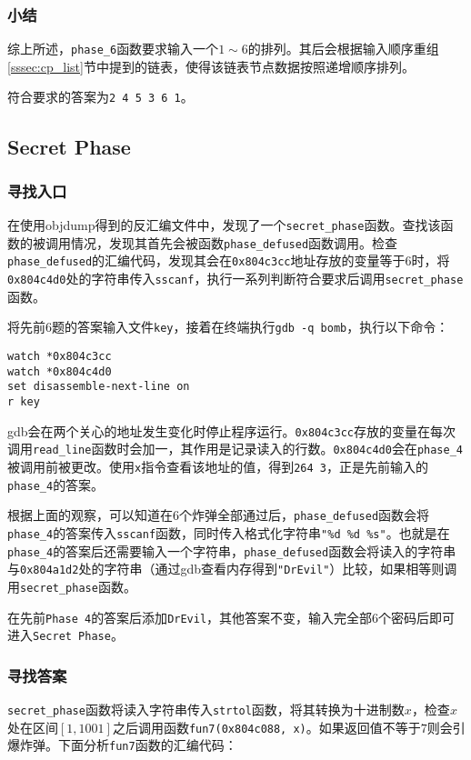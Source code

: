 \documentclass[a4paper, 11pt]{ctexart}
\begin{document}
\subsubsection{小结}

综上所述，\texttt{phase\_6}函数要求输入一个$1\sim 6$的排列。其后会根据输入顺序重组\ref{sssec:cp_list}节中提到的链表，使得该链表节点数据按照递增顺序排列。

符合要求的答案为\texttt{2 4 5 3 6 1}。

\subsection{Secret Phase}
\subsubsection{寻找入口}
在使用objdump得到的反汇编文件中，发现了一个\texttt{secret\_phase}函数。查找该函数的被调用情况，发现其首先会被函数\texttt{phase\_defused}函数调用。检查\texttt{phase\_defused}的汇编代码，发现其会在\texttt{0x804c3cc}地址存放的变量等于6时，将\texttt{0x804c4d0}处的字符串传入\texttt{sscanf}，执行一系列判断符合要求后调用\texttt{secret\_phase}函数。

将先前6题的答案输入文件\texttt{key}，接着在终端执行\texttt{gdb -q bomb}，执行以下命令：

\begin{verbatim}
watch *0x804c3cc
watch *0x804c4d0
set disassemble-next-line on
r key
\end{verbatim}

gdb会在两个关心的地址发生变化时停止程序运行。\texttt{0x804c3cc}存放的变量在每次调用\texttt{read\_line}函数时会加一，其作用是记录读入的行数。\texttt{0x804c4d0}会在\texttt{phase\_4}被调用前被更改。使用\texttt{x}指令查看该地址的值，得到\texttt{264 3}，正是先前输入的\texttt{phase\_4}的答案。

根据上面的观察，可以知道在6个炸弹全部通过后，\texttt{phase\_defused}函数会将\texttt{phase\_4}的答案传入\texttt{sscanf}函数，同时传入格式化字符串\texttt{"\%d \%d \%s"}。也就是在\texttt{phase\_4}的答案后还需要输入一个字符串，\texttt{phase\_defused}函数会将读入的字符串与\texttt{0x804a1d2}处的字符串（通过gdb查看内存得到\texttt{"DrEvil"}）比较，如果相等则调用\texttt{secret\_phase}函数。

在先前\texttt{Phase 4}的答案后添加\texttt{DrEvil}，其他答案不变，输入完全部6个密码后即可进入\texttt{Secret Phase}。

\subsubsection{寻找答案}
\texttt{secret\_phase}函数将读入字符串传入\texttt{strtol}函数，将其转换为十进制数$x$，检查$x$处在区间$[1,1001]$之后调用函数\texttt{fun7(0x804c088, x)}。如果返回值不等于$7$则会引爆炸弹。下面分析\texttt{fun7}函数的汇编代码：
\end{document}
